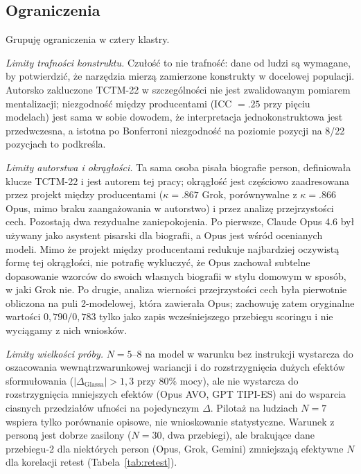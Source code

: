 \documentclass[11pt,a4paper]{article}
\begin{document}
\subsection{Ograniczenia}

Grupuję ograniczenia w cztery klastry.

\emph{Limity trafności konstruktu.} Czułość to nie trafność: dane od ludzi są wymagane, by potwierdzić, że narzędzia mierzą zamierzone konstrukty w docelowej populacji. Autorsko zakluczone TCTM-22 w szczególności nie jest zwalidowanym pomiarem mentalizacji; niezgodność między producentami (ICC $= .25$ przy pięciu modelach) jest sama w sobie dowodem, że interpretacja jednokonstruktowa jest przedwczesna, a istotna po Bonferroni niezgodność na poziomie pozycji na 8/22 pozycjach to podkreśla.

\emph{Limity autorstwa i okrągłości.} Ta sama osoba pisała biografie person, definiowała klucze TCTM-22 i jest autorem tej pracy; okrągłość jest częściowo zaadresowana przez projekt między producentami ($\kappa = .867$ Grok, porównywalne z $\kappa = .866$ Opus, mimo braku zaangażowania w autorstwo) i przez analizę przejrzystości cech. Pozostają dwa rezydualne zaniepokojenia. Po pierwsze, Claude Opus 4.6 był używany jako asystent pisarski dla biografii, a Opus jest wśród ocenianych modeli. Mimo że projekt między producentami redukuje najbardziej oczywistą formę tej okrągłości, nie potrafię wykluczyć, że Opus zachował subtelne dopasowanie wzorców do swoich własnych biografii w stylu domowym w sposób, w jaki Grok nie. Po drugie, analiza wierności przejrzystości cech była pierwotnie obliczona na puli 2-modelowej, która zawierała Opus; zachowuję zatem oryginalne wartości $0{,}790 / 0{,}783$ tylko jako zapis wcześniejszego przebiegu scoringu i nie wyciągamy z nich wniosków.

\emph{Limity wielkości próby.} $N = 5$--$8$ na model w warunku bez instrukcji wystarcza do oszacowania wewnątrzwarunkowej wariancji i do rozstrzygnięcia dużych efektów sformułowania ($|\Delta_{\text{Glassa}}| > 1{,}3$ przy 80\% mocy), ale nie wystarcza do rozstrzygnięcia mniejszych efektów (Opus AVO, GPT TIPI-ES) ani do wsparcia ciasnych przedziałów ufności na pojedynczym $\Delta$. Pilotaż na ludziach $N = 7$ wspiera tylko porównanie opisowe, nie wnioskowanie statystyczne. Warunek z personą jest dobrze zasilony ($N = 30$, dwa przebiegi), ale brakujące dane przebiegu-2 dla niektórych person (Opus, Grok, Gemini) zmniejszają efektywne $N$ dla korelacji retest (Tabela~\ref{tab:retest}).
\end{document}
